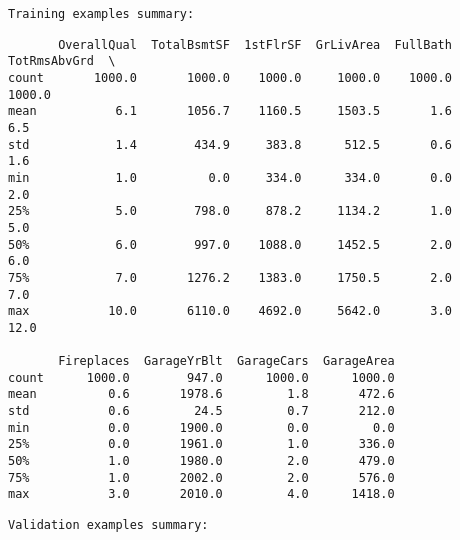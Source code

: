 \documentclass[11pt]{article}
\begin{document}
    \begin{Verbatim}[commandchars=\\\{\}]
Training examples summary:

    \end{Verbatim}

    
    \begin{verbatim}
       OverallQual  TotalBsmtSF  1stFlrSF  GrLivArea  FullBath  TotRmsAbvGrd  \
count       1000.0       1000.0    1000.0     1000.0    1000.0        1000.0   
mean           6.1       1056.7    1160.5     1503.5       1.6           6.5   
std            1.4        434.9     383.8      512.5       0.6           1.6   
min            1.0          0.0     334.0      334.0       0.0           2.0   
25%            5.0        798.0     878.2     1134.2       1.0           5.0   
50%            6.0        997.0    1088.0     1452.5       2.0           6.0   
75%            7.0       1276.2    1383.0     1750.5       2.0           7.0   
max           10.0       6110.0    4692.0     5642.0       3.0          12.0   

       Fireplaces  GarageYrBlt  GarageCars  GarageArea  
count      1000.0        947.0      1000.0      1000.0  
mean          0.6       1978.6         1.8       472.6  
std           0.6         24.5         0.7       212.0  
min           0.0       1900.0         0.0         0.0  
25%           0.0       1961.0         1.0       336.0  
50%           1.0       1980.0         2.0       479.0  
75%           1.0       2002.0         2.0       576.0  
max           3.0       2010.0         4.0      1418.0  
    \end{verbatim}

    
    \begin{Verbatim}[commandchars=\\\{\}]
Validation examples summary:

    \end{Verbatim}
\end{document}
